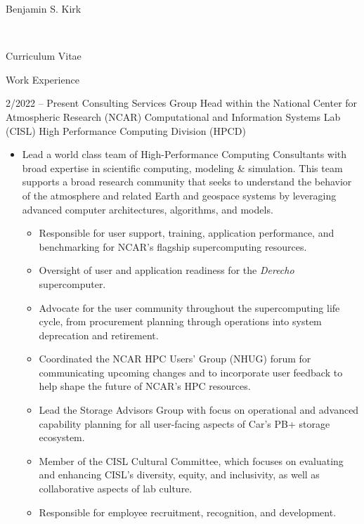 \documentclass[10pt]{report}
\begin{document}
\begin{cv}{\centerline{\Large Benjamin S. Kirk}\\
    \centerline{\large Curriculum Vitae}}
  \vspace{-.5em}
  \begin{cvlist}{Work Experience}
  \item[2/2022 -- Present]
    Consulting Services Group Head within the National Center for Atmospheric Research (NCAR) Computational and Information Systems Lab (CISL) High Performance Computing Division (HPCD)
    \begin{itemize}
    \item Lead a world class team of High-Performance Computing Consultants with broad expertise in scientific computing, modeling \& simulation. This team supports a broad research community that seeks to understand the behavior of the atmosphere and related Earth and geospace systems by leveraging advanced computer architectures, algorithms, and models.
      \begin{itemize}
      \item Responsible for user support, training, application performance, and benchmarking for NCAR's flagship supercomputing resources.
      \item Oversight of user and application readiness for the \emph{Derecho} supercomputer.
      \item Advocate for the user community throughout the supercomputing life cycle, from procurement planning through operations into system deprecation and retirement.
      \item Coordinated the NCAR HPC Users' Group (NHUG) forum for communicating upcoming changes and to incorporate user feedback to help shape the future of NCAR's HPC resources.
      \item Lead the Storage Advisors Group with focus on operational and advanced capability planning for all user-facing aspects of Car's \unit[150]{PB}+ storage ecosystem.
      \item Member of the CISL Cultural Committee, which focuses on evaluating and enhancing CISL's diversity, equity, and inclusivity, as well as collaborative aspects of lab culture.
      \item Responsible for employee recruitment, recognition, and development.
      \end{itemize}
    \end{itemize}



\end{cvlist}
\end{cv}
\end{document}
